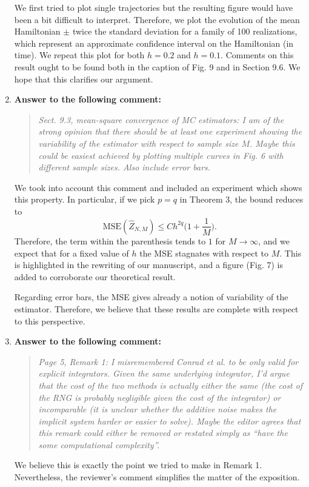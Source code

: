 \documentclass[10pt]{article}
\begin{document}
\begin{enumerate}
We first tried to plot single trajectories but the resulting figure would have been a bit difficult to interpret. Therefore, we plot the evolution of the mean Hamiltonian $\pm$ twice the standard deviation for a family of 100 realizations, which represent an approximate confidence interval on the Hamiltonian (in time). We repeat this plot for both $h = 0.2$ and $h = 0.1$. Comments on this result ought to be found both in the caption of Fig. 9 and in Section 9.6. We hope that this clarifies our argument.

\item \textbf{Answer to the following comment:}
\begin{quote} \textit{Sect. 9.3, mean-square convergence of MC estimators: I am of the strong opinion that there should be at least one experiment showing the variability of the estimator with respect to sample size $M$. Maybe this could be easiest achieved by plotting multiple curves in Fig. 6 with different sample sizes. Also include error bars.} \end{quote}
We took into account this comment and included an experiment which shows this property. In particular, if we pick $p = q$ in Theorem 3, the bound reduces to
\begin{equation*}
	\mathrm{MSE}(\widehat Z_{N, M}) \leq Ch^{2q} \Big(1 + \frac{1}{M}\Big).
\end{equation*}
Therefore, the term within the parenthesis tends to $1$ for $M \to \infty$, and we expect that for a fixed value of $h$ the MSE stagnates with respect to $M$. This is highlighted in the rewriting of our manuscript, and a figure (Fig. 7) is added to corroborate our theoretical result. 

Regarding error bars, the MSE gives already a notion of variability of the estimator. Therefore, we believe that these results are complete with respect to this perspective.

\item \textbf{Answer to the following comment:}
\begin{quote} \textit{Page 5, Remark 1: I misremembered Conrad et al. to be only valid for explicit integrators. Given the same underlying integrator, I’d argue that the cost of the two methods is actually either the same (the cost of the RNG is probably negligible given the cost of the integrator) or incomparable (it is unclear whether the additive noise makes the implicit system harder or easier to solve). Maybe the editor agrees that this remark could either be removed or restated simply as ``have the some computational complexity''.} \end{quote}
We believe this is exactly the point we tried to make in Remark 1. Nevertheless, the reviewer's comment simplifies the matter of the exposition.


\end{enumerate}
\end{document}
